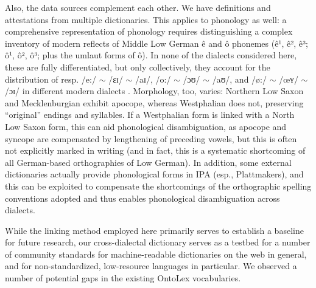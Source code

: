 \documentclass[11pt]{article}
\begin{document}
\begin{enumerate}
Also, the data sources complement each other. We have definitions and attestations from multiple dictionaries. This applies to phonology as well: a comprehensive representation of phonology requires distinguishing a complex inventory of modern reflects of Middle Low German ê and ô phonemes (ê¹, ê², ê³; ô¹, ô², ô³; plus the umlaut forms of ô). 
In none of the dialects considered here, these are fully differentiated, but only collectively, they account for the distribution of resp. /e:/ $\sim$ /ɛɪ/ $\sim$ /aɪ/, /o:/ $\sim$ /ɔʊ/ $\sim$ /aʊ/, and /ø:/ $\sim$ /œʏ/ $\sim$ /ɔɪ/ in different modern dialects \cite{seelmann1908mundart}. Morphology, too, varies: Northern Low Saxon and Mecklenburgian exhibit apocope, whereas Westphalian does not, preserving ``original'' endings and syllables. If a Westphalian form is linked with a North Low Saxon form, this can aid phonological disambiguation, as apocope and syncope are compensated by lengthening of preceding vowels, but this is often not explicitly marked in writing (and in fact, this is a systematic shortcoming of all German-based orthographies of Low German). In addition, some external dictionaries actually provide phonological forms in IPA (esp., Plattmakers), and this can be exploited to compensate the shortcomings of the orthographic spelling conventions adopted and thus enables phonological disambiguation across dialects.

While the linking method employed here primarily serves to establish a baseline for future research, our cross-dialectal dictionary serves as a testbed for a number of community standards for machine-readable dictionaries on the web in general, and for non-standardized, low-resource languages in particular.
We observed a number of potential gaps in the existing OntoLex vocabularies. 


\end{enumerate}
\end{document}
